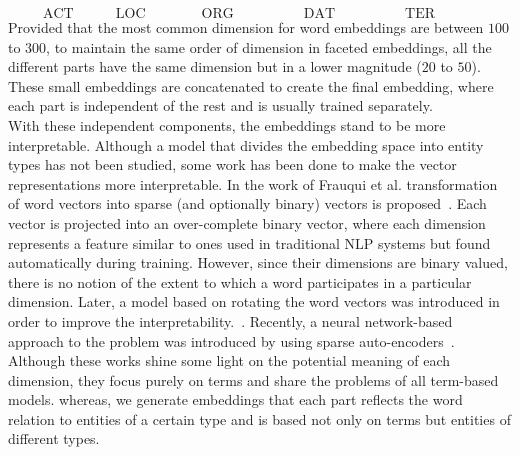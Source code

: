 $$ \quad  \mathrm{ACT} \quad  \qquad  \mathrm{LOC}\qquad \qquad \mathrm{ORG}\qquad \quad \qquad \mathrm{DAT}\qquad \quad  \qquad  \mathrm{TER}\qquad \qquad$$
\mathcenter
Provided that the most common dimension for word embeddings are between $100$ to $300$, to maintain the same order of dimension in faceted embeddings, all the different parts have the same dimension but in a lower magnitude ($20$ to $50$). These small embeddings are concatenated to create the final embedding, where each part is independent of the rest and is usually trained separately.\\
With these independent components, the embeddings stand to be more interpretable. Although a model that divides the embedding space into entity types has not been studied, some work has been done to make the vector representations more interpretable. In the work of Frauqui et al. transformation of word vectors into sparse (and optionally binary) vectors is proposed~. Each vector is projected into an over-complete binary vector, where each dimension represents a feature similar to ones used in traditional NLP systems but found automatically during training. However, since their dimensions are binary valued, there is no notion of the extent to which a word participates in a particular dimension. Later, a model based on rotating the word vectors was introduced in order to improve the interpretability.~. Recently, a neural network-based approach to the problem was introduced by using sparse auto-encoders~. Although these works shine some light on the potential meaning of each dimension, they focus purely on terms and share the problems of all term-based models. whereas, we generate embeddings that each part reflects the word relation to entities of a certain type and is based not only on terms but entities of different types. \\
